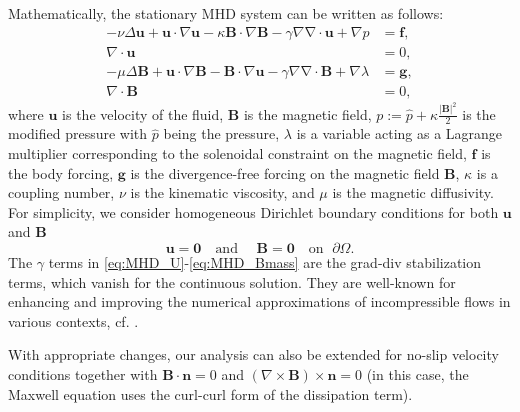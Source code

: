 \documentclass[3p]{elsarticle}
\def\V#1{\mathbf{#1}}
\newcommand{\divergence}{\mathrm{\nabla \cdot}}
\begin{document}
 Mathematically, the stationary MHD system can be written as follows:
\begin{align}
- \nu\Delta \V{u} 
+ \V{u} \cdot \nabla \V{u} - \kappa \V{B}\cdot \nabla \V{B} - \gamma \nabla \divergence \V{u} + \nabla p  &= \V{f}, \label{eq:MHD_U} \\
\nabla \cdot \V{u} &= 0, \label{eq:MHD_Umass} \\
- \mu\Delta \V{B} + \V{u} \cdot \nabla \V{B} - \V{B} \cdot \nabla \V{u} - \gamma \nabla \divergence \V{B} + \nabla \lambda  &= \V{g}, \label{eq:MHD_B} \\
\nabla \cdot \V{B} &= 0, \label{eq:MHD_Bmass}
\end{align}
where $\V{u}$ is the velocity of the fluid, $\V{B}$ is the magnetic field, $p:=\hat{p}+\kappa\frac{|\V{B}|^2}{2}$ is the modified pressure with $\hat{p}$ being the pressure, $\lambda $ is a variable acting as a Lagrange multiplier corresponding to the solenoidal constraint on the magnetic field, $\V{f}$ is the body forcing, $ \V{g}$ is the divergence-free forcing on the magnetic field $\V{B}$, $\kappa$ is a coupling number, $\nu$ is the kinematic viscosity, and $\mu$ is the magnetic diffusivity. 
For simplicity, we consider homogeneous Dirichlet boundary conditions for both $\V{u}$ and $\V{B}$
\begin{equation}\label{BC}
\V{u} = \V{0} \quad \text{and } \quad \V{B}=\V{0} \quad \text{on } \; \partial \Omega.
\end{equation} 
The $\gamma$ terms in \eqref{eq:MHD_U}-\eqref{eq:MHD_Bmass} are the grad-div stabilization terms, which vanish for the continuous solution. They are well-known for enhancing and improving the numerical approximations of incompressible flows in various contexts, cf. \cite{https://doi.org/10.1002/fld.3654,GEREDELI2023114920,JenJohLinReb2014,OlsReu2004}.

With appropriate changes, our analysis can also be extended for no-slip velocity conditions together with $\V{B} \cdot \V{n} = 0$  and  $ (\nabla \times \V{B}) \times \V{n} = 0$  (in this case, the Maxwell equation uses the curl-curl form of the dissipation term).
\end{document}
